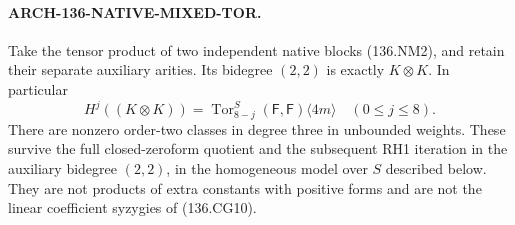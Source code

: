 \paragraph{ARCH-136-NATIVE-MIXED-TOR.}
Take the tensor product of two independent native blocks
(136.NM2), and retain their separate auxiliary arities. Its
bidegree \((2,2)\) is exactly \(K\otimes K\). In particular
\[
 H^j((K\otimes K))=
             \operatorname{Tor}_{8-j}^S(\mathsf F,\mathsf F)\langle4m\rangle
                                  \quad(0\leq j\leq8).
                                                               \tag{136.NM6}
\]
There are nonzero order-two classes in degree three in
unbounded weights. These survive the full closed-zeroform
quotient and the subsequent RH1 iteration in the auxiliary
bidegree \((2,2)\), in the homogeneous model over \(S\)
described below. They are not products of extra constants
with positive forms and are not the linear coefficient
syzygies of (136.CG10).

